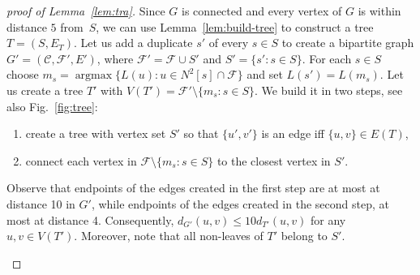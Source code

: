 \documentclass{article}
\newcommand{\F}{\mathcal{F}}
\newcommand{\C}{\mathcal{C}}
\newcommand{\sm}{\setminus}
\DeclareMathOperator{\argmax}{argmax}
\theoremstyle{plain}
\theoremstyle{definition}
\begin{document}
\begin{proof}[proof of Lemma~\ref{lem:tra}]
Since $G$ is connected and every vertex of $G$ is within distance $5$ from~$S$,
we can use Lemma~\ref{lem:build-tree} to construct a tree $T=(S,E_T)$.
Let us add a duplicate $s'$ of every $s\in S$ to create a bipartite graph
$G'=(\C,\F',E')$, where $\F' = \F \cup S'$ and $S'=\{s' : s\in S\}$.
For each $s\in S$ choose $m_s = \argmax\{ L(u) : u\in  N^2[s]\cap \F\}$ and set  $L(s') = L(m_s)$.
Let us create a tree $T'$ with $V(T')=\F'\sm \{m_s : s\in S\}$.
We build it in two steps, see also Fig.~\ref{fig:tree}:
\begin{enumerate}
  \item create a tree with vertex set $S'$ so that $\{u',v'\}$ is an edge iff
  $\{u,v\}\in E(T)$,
  \item connect each vertex in $\F \sm \{m_s : s\in S\}$ to the closest vertex
  in $S'$.
\end{enumerate}
Observe that endpoints of the edges created in the first step are at most at
distance 10 in $G'$, while endpoints of the edges created in the second step, at
most at distance 4.
Consequently, $d_{G'}(u,v)\le 10 d_{T'}(u,v)$ for any $u,v\in V(T')$.
Moreover, note that all non-leaves of $T'$ belong to $S'$.

\begin{figure}
\begin{center}
\end{center}
\end{figure}
\end{proof}
\end{document}
